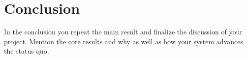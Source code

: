 \documentclass[a4paper,11pt,oneside]{report}
\begin{document}
\chapter{Conclusion}

In the conclusion you repeat the main result and finalize the discussion of
your project. Mention the core results and why as well as how your system
advances the status quo.

\cleardoublepage {} {}
\printbibliography

%
%
\end{document}
